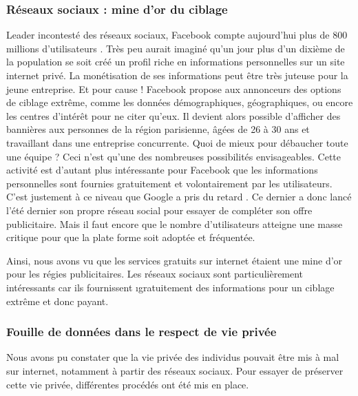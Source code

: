 \subsubsection{Réseaux sociaux : mine d'or du ciblage}
Leader incontesté des réseaux sociaux, Facebook compte aujourd'hui plus de 800 millions d'utilisateurs \cite{statsFB}. Très peu aurait imaginé qu'un jour plus d'un dixième de la population se soit créé un profil riche en informations personnelles sur un site internet privé. La monétisation de ses informations peut être très juteuse pour la jeune entreprise. Et pour cause ! Facebook propose aux annonceurs des options de ciblage extrême, comme les données démographiques, géographiques, ou encore les centres d'intérêt pour ne citer qu'eux. Il devient alors possible d'afficher des bannières aux personnes de la région parisienne, âgées de 26 à 30 ans et travaillant dans une entreprise concurrente. Quoi de mieux pour débaucher toute une équipe ?
Ceci n'est qu'une des nombreuses possibilités envisageables. Cette activité est d'autant plus intéressante pour Facebook que les informations personnelles sont fournies gratuitement et volontairement par les utilisateurs. C'est justement à ce niveau que Google a pris du retard \cite{pubReseauxSociaux}. Ce dernier a donc lancé l'été dernier son propre réseau social pour essayer de compléter son offre publicitaire. Mais il faut encore que le nombre d'utilisateurs atteigne une masse critique pour que la plate forme soit adoptée et fréquentée.

Ainsi, nous avons vu que les services gratuits sur internet étaient une mine d'or pour les régies publicitaires. Les réseaux sociaux sont particulièrement intéressants car ils fournissent \i{gratuitement} des informations pour un ciblage extrême et donc payant.

\subsubsection{Fouille de données dans le respect de vie privée}

Nous avons pu constater que la vie privée des individus pouvait être mis à mal sur internet, notamment à partir des réseaux sociaux. Pour essayer de préserver cette vie privée, différentes procédés ont été mis en place.

